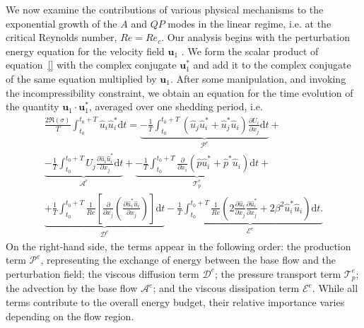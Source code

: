 We now examine the contributions of various physical mechanisms to the exponential growth of the $A$ and $QP$ modes in the linear regime, i.e. at the critical Reynolds number, $Re = Re_c$. Our analysis begins with the perturbation energy equation for the velocity field $\bm{u}_1$ \citep[][]{}. We form the scalar product of equation~\eqref{} with the complex conjugate $\bm{u}_1^*$ and add it to the complex conjugate of the same equation multiplied by $\bm{u}_1$. After some manipulation, and invoking the incompressibility constraint, we obtain an equation for the time evolution of the quantity $\bm{u}_1 \cdot \bm{u}_1^*$, averaged over one shedding period, i.e.
\begin{equation}
  \begin{gathered}
  \frac{2 \Re(\sigma)}{T} \int_{t_0}^{t_0+T} \hat{u}_i \hat{u}_i^* \text{d}t = 
 \underbrace{-\frac{1}{T} \int_{t_0}^{t_0+T} \left( \hat{u}_j \hat{u}_i^* + \hat{u}_j^* \hat{u}_i \right) \frac{\partial U_i}{\partial x_j} \text{d} t}_{\mathcal{P}^e} +\\
 \underbrace{-\frac{1}{T} \int_{t_0}^{t_0+T} U_j \frac{\partial \hat{u}_i \hat{u}_i^*}{\partial x_j} \text{d} t }_{\mathcal{A}^e} + 
 \underbrace{-\frac{1}{T} \int_{t_0}^{t_0+T} \frac{\partial}{\partial x_i} \left( \hat{p} \hat{u}_i^* + \hat{p}^* \hat{u}_i \right) \text{d}t }_{\mathcal{T}_p^e}+ \\
\underbrace{ +\frac{1}{T} \int_{t_0}^{t_0+T} \frac{1}{Re} \left[ \frac{\partial}{\partial x_j} \left( \frac{\partial \hat{u}_i^* \hat{u}_i }{\partial x_j} \right) \right] \text{d}t }_{\mathcal{D}^e }
 - \underbrace{ \frac{1}{T} \int_{t_0}^{t_0+T} \frac{1}{Re} \left( 2 \frac{\partial \hat{u}_i}{\partial x_j} \frac{\partial \hat{u}_i^*}{\partial x_j} + 2 \beta^2 \hat{u}_i^* \hat{u}_i \right) \text{d} t. }_{\mathcal{E}^e}
 \end{gathered}
\end{equation}
%
On the right-hand side, the terms appear in the following order: the production term $\mathcal{P}^e$, representing the exchange of energy between the base flow and the perturbation field; the viscous diffusion term $\mathcal{D}^e$; the pressure transport term $\mathcal{T}_p^e$; the advection by the base flow $\mathcal{A}^e$; and the viscous dissipation term $\mathcal{E}^e$. While all terms contribute to the overall energy budget, their relative importance varies depending on the flow region.

